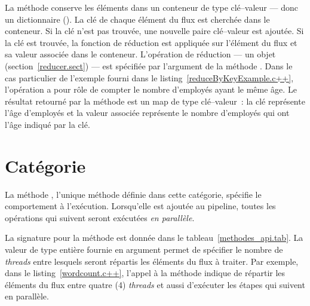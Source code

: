 La m\'ethode  conserve les \'el\'ements dans un conteneur de type cl\'e--valeur --- donc un dictionnaire (). La cl\'e de chaque \'el\'ement du flux est cherch\'ee dans le conteneur. Si la cl\'e n'est pas trouv\'ee, une nouvelle paire cl\'e--valeur est ajout\'ee. Si la cl\'e est trouv\'ee, la fonction de r\'eduction est appliqu\'ee sur l'\'el\'ement du flux et sa valeur associ\'ee dans le conteneur. L'op\'eration de r\'eduction --- un objet  (section~\ref{reducer.sect})  --- est sp\'ecifi\'ee par l'argument de la m\'ethode . Dans le cas particulier de l'exemple fourni dans le listing~\ref{reduceByKeyExample.c++}, l'op\'eration a pour r\^ole de compter le nombre d'employ\'es ayant le m\^eme \^age. Le r\'esultat retourn\'e par la m\'ethode  est un map de type cl\'e--valeur~: la cl\'e repr\'esente l'\^age d'employ\'es et la valeur associ\'ee repr\'esente le nombre d'employ\'es qui ont l'\^age indiqu\'e par la cl\'e.

\section{Cat\'egorie }

\label{execution.sect}




La m\'ethode , l'unique m\'ethode d\'efinie dans cette cat\'egorie, sp\'ecifie le comportement \`a l'ex\'ecution. Lorsqu'elle est ajout\'ee au pipeline, toutes les op\'erations qui suivent seront ex\'ecut\'ees \emph{en parall\`ele}.

La signature pour la m\'ethode  est donn\'ee dans le tableau~\ref{methodes_api.tab}. La valeur de type enti\`ere fournie en argument permet de sp\'ecifier le nombre de \emph{threads} entre lesquels seront r\'epartis les \'el\'ements du flux \`a traiter. Par exemple, dans le listing~\ref{wordcount.c++}, l'appel \`a la méthode  indique de r\'epartir les \'el\'ements du flux entre quatre (4) \emph{threads} et aussi d'ex\'ecuter les \'etapes qui suivent en parall\`ele.

